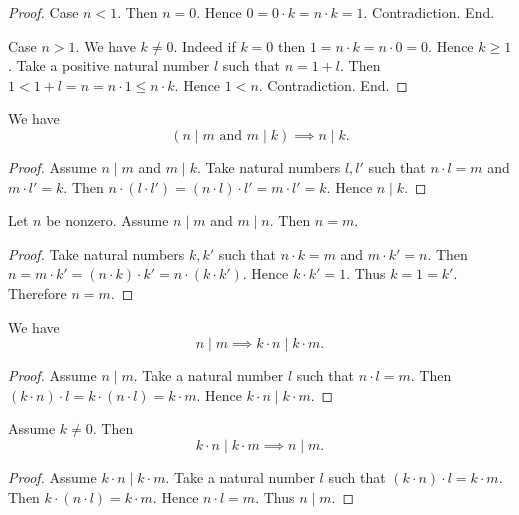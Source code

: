 \documentclass[../../arithmetic.tex]{subfiles}
\begin{document}
\begin{forthel}
\begin{proof}
      Case $n < 1$.
        Then $n = 0$.
        Hence $0 = 0 \cdot k = n \cdot k = 1$.
        Contradiction.
      End.

      Case $n > 1$.
        We have $k \neq 0$.
        Indeed if $k = 0$ then $1 = n \cdot k = n \cdot 0 = 0$.
        Hence $k \geq 1$.
        Take a positive natural number $l$ such that $n = 1 + l$.
        Then $1 < 1 + l = n = n \cdot 1 \leq n \cdot k$.
        Hence $1 < n$.
        Contradiction.
      End.
    \end{proof}

    \begin{proposition}\label{Arithmetic_03_01_364584}
      We have \[ (\text{$n \mid m$ and $m \mid k$}) \implies n \mid k. \]
    \end{proposition}
    \begin{proof}
      Assume $n \mid m$ and $m \mid k$.
      Take natural numbers $l,l'$ such that $n \cdot l = m$ and $m \cdot l' = k$.
      Then $n \cdot (l \cdot l') = (n \cdot l) \cdot l' = m \cdot l' = k$.
      Hence $n \mid k$.
    \end{proof}

    \begin{proposition}\label{Arithmetic_03_01_185910}
      Let $n$ be nonzero.
      Assume $n \mid m$ and $m \mid n$.
      Then $n = m$.
    \end{proposition}
    \begin{proof}
      Take natural numbers $k,k'$ such that $n \cdot k = m$ and $m \cdot k' = n$.
      Then $n = m \cdot k' = (n \cdot k) \cdot k' = n \cdot (k \cdot k')$.
      Hence $k \cdot k' = 1$.
      Thus $k = 1 = k'$.
      Therefore $n = m$.
    \end{proof}

    \begin{proposition}\label{Arithmetic_03_01_710814}
      We have \[ n \mid m \implies k \cdot n \mid k \cdot m. \]
    \end{proposition}
    \begin{proof}
      Assume $n \mid m$.
      Take a natural number $l$ such that $n \cdot l = m$.
      Then $(k \cdot n) \cdot l = k \cdot (n \cdot l) = k \cdot m$.
      Hence $k \cdot n \mid k \cdot m$.
    \end{proof}

    \begin{proposition}\label{Arithmetic_03_01_382863}
      Assume $k \neq 0$.
      Then \[ k \cdot n \mid k \cdot m \implies n \mid m. \]
    \end{proposition}
    \begin{proof}
      Assume $k \cdot n \mid k \cdot m$.
      Take a natural number $l$ such that $(k \cdot n) \cdot l = k \cdot m$.
      Then $k \cdot (n \cdot l) = k \cdot m$.
      Hence $n \cdot l = m$.
      Thus $n \mid m$.
    \end{proof}


\end{forthel}
\end{document}
